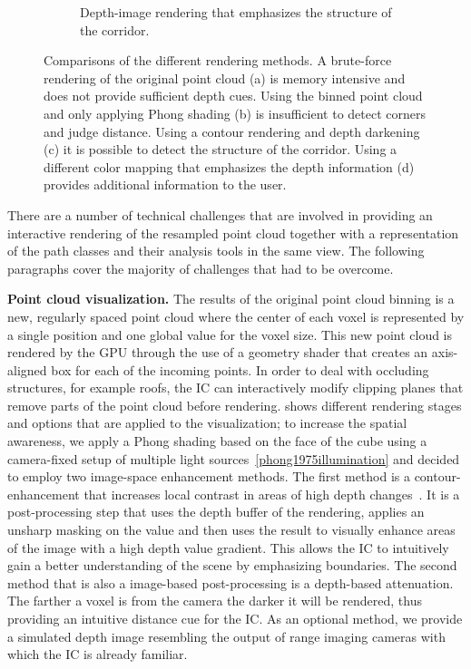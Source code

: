 \begin{figure}
\begin{subfigure}[b]{0.21\textwidth}
    \caption{Depth-image rendering that emphasizes the structure of the corridor.}
    \label{contributions:usar:rendering:depth}
\end{subfigure}
\caption{Comparisons of the different rendering methods.  A brute-force rendering of the original point cloud (a) is memory intensive and does not provide sufficient depth cues.  Using the binned point cloud and only applying Phong shading (b) is insufficient to detect corners and judge distance.  Using a contour rendering and depth darkening (c) it is possible to detect the structure of the corridor.  Using a different color mapping that emphasizes the depth information (d) provides additional information to the user.}
\label{contributions:usar:rendering}
\end{figure}

There are a number of technical challenges that are involved in providing an interactive rendering of the resampled point cloud together with a representation of the path classes and their analysis tools in the same view.  The following paragraphs cover the majority of challenges that had to be overcome.

\textbf{Point cloud visualization. }  The results of the original point cloud binning is a new, regularly spaced point cloud where the center of each voxel is represented by a single  position and one global value for the voxel size.  This new point cloud is rendered by the GPU through the use of a geometry shader that creates an axis-aligned box for each of the incoming points.  In order to deal with occluding structures, for example roofs, the IC can interactively modify clipping planes that remove parts of the point cloud before rendering.   shows different rendering stages and options that are applied to the visualization; to increase the spatial awareness, we apply a Phong shading based on the face of the cube using a camera-fixed setup of multiple light sources~\ref{phong1975illumination} and decided to employ two image-space enhancement methods.  The first method is a contour-enhancement that increases local contrast in areas of high depth changes~\etal \cite{luft2006image}.  It is a post-processing step that uses the depth buffer of the rendering, applies an unsharp masking on the value and then uses the result to visually enhance areas of the image with a high depth value gradient.  This allows the IC to intuitively gain a better understanding of the scene by emphasizing boundaries.  The second method that is also a image-based post-processing is a depth-based attenuation.  The farther a voxel is from the camera the darker it will be rendered, thus providing an intuitive distance cue for the IC.  As an optional method, we provide a simulated depth image resembling the output of range imaging cameras with which the IC is already familiar.

